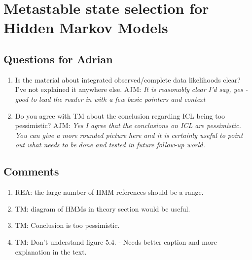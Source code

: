 \let\textcircled=\pgftextcircled
\chapter{Metastable state selection for Hidden Markov Models}
\label{chap:hmm}


\section{Questions for Adrian}
\begin{enumerate}
    \item Is the material about integrated observed/complete data likelihoods clear? I've not explained it anywhere else.  
    AJM: \emph{It is reasonably clear I’d say, yes - good to lead the reader in with a few basic pointers and context}
    \item Do you agree with TM about the conclusion regarding ICL being too pessimistic? 
    AJM: \emph{Yes I agree that the conclusions on ICL are pessimistic. You can give a more rounded picture here and it is certainly useful to point out what needs to be done and tested in future follow-up world.}
\end{enumerate}

\section{Comments}
\begin{enumerate}
\item REA: the large number of HMM references should be a range. 
\item TM: diagram of HMMs in theory section would be useful.
\item TM: Conclusion is too pessimistic. 
\item TM: Don't understand figure 5.4. - Needs better caption and more explanation in the text.  

\end{enumerate}


